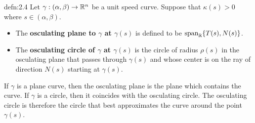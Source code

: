 \begin{defn}{defn:2.4}
    Let $\gamma : (\alpha, \beta) \to \mathbb{R}^n$ be a unit speed curve. Suppose that 
    $\kappa(s) > 0$ where $s \in (\alpha, \beta)$.
    \begin{itemize} 
        \item The {\bf osculating plane to $\gamma$ at $\gamma(s)$} is defined to be
        $\operatorname{span}_{\mathbb{R}}\{T(s), N(s)\}$.
        \item The {\bf osculating circle of $\gamma$ at $\gamma(s)$} is the 
        circle of radius $\rho(s)$ in the osculating plane that passes 
        through $\gamma(s)$ and whose center is on the ray of direction 
        $N(s)$ starting at $\gamma(s)$. 
    \end{itemize}
\end{defn}\vspace{-0.25cm} 
If $\gamma$ is a plane curve, then the osculating plane is the plane 
which contains the curve. If $\gamma$ is a circle, then it coincides 
with the osculating circle. The osculating circle is therefore the 
circle that best approximates the curve around the point $\gamma(s)$. 

